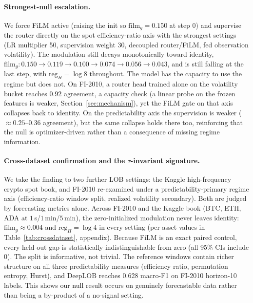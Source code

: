 \documentclass{article}
\newcommand{\filmG}{\mathrm{film}_g}
\newcommand{\regH}{\mathrm{reg}_H}
\begin{document}
\paragraph{Strongest-null escalation.} We force FiLM active (raising the init so $\filmG=0.150$ at step 0) and supervise the router directly on the spot efficiency-ratio axis with the strongest settings (LR multiplier 50, supervision weight 30, decoupled router/FiLM, fed observation volatility). The modulation still decays monotonically toward identity, $\filmG:0.150\to0.119\to0.100\to0.074\to0.056\to0.043$, and is still falling at the last step, with $\regH=\log 8$ throughout. The model has the capacity to use the regime but does not. On FI-2010, a router head trained alone on the volatility bucket reaches 0.92 agreement, a capacity check (a linear probe on the frozen features is weaker, Section~\ref{sec:mechanism}), yet the FiLM gate on that axis collapses back to identity. On the predictability axis the supervision is weaker ($\approx 0.25–0.36$ agreement), but the same collapse holds there too, reinforcing that the null is optimizer-driven rather than a consequence of missing regime information.

\paragraph{Cross-dataset confirmation and the $\tau$-invariant signature.} We take the finding to two further LOB settings: the Kaggle high-frequency crypto spot book, and FI-2010 re-examined under a predictability-primary regime axis (efficiency-ratio window split, realized volatility secondary). Both are judged by forecasting metrics alone. Across FI-2010 and the Kaggle book (BTC, ETH, ADA at $1\,$s/$1\,$min/$5\,$min), the zero-initialized modulation never leaves identity: $\filmG\approx0.004$ and $\regH=\log4$ in every setting (per-asset values in Table~\ref{tab:crossdataset}, appendix). Because FiLM is an exact paired control, every held-out gap is statistically indistinguishable from zero (all 95\% CIs include 0). The split is informative, not trivial. The reference windows contain richer structure on all three predictability measures (efficiency ratio, permutation entropy, Hurst), and DeepLOB reaches 0.628 macro-F1 on FI-2010 horizon-10 labels. This shows our null result occurs on genuinely forecastable data rather than being a by-product of a no-signal setting.
\end{document}
